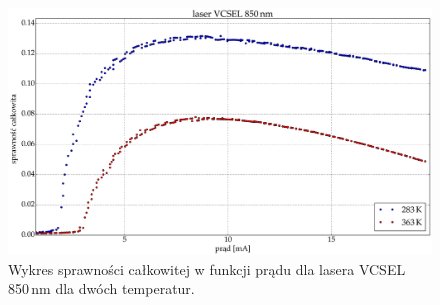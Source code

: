 \begin{figure}
\center
  \includegraphics[scale=0.25]{plot_vcsel_850/plot_wall_eff.eps}
  \caption{Wykres sprawności całkowitej w funkcji prądu dla lasera VCSEL 850\,nm dla dwóch temperatur.}
  \label{fig:plot_wall_eff_vcsel850}
\end{figure}
\newpage
